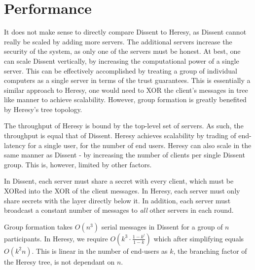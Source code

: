\section{Performance}

It does not make sense to directly compare Dissent to Heresy, as Dissent cannot really be scaled by adding more servers. The additional servers increase the security of the system, as only one of the servers must be honest. At best, one can scale Dissent vertically, by increasing the computational power of a single server. This can be effectively accomplished by treating a group of individual computers as a single server in terms of the trust guarantees. This is essentially a similar approach to Heresy, one would need to XOR the client's messages in tree like manner to achieve scalability. However, group formation is greatly benefited  by Heresy's tree topology.

The throughput of Heresy is bound by the top-level set of servers. As such,
the throughput is equal that of Dissent. Heresy achieves scalability by trading of end-latency for a single user, for the number of end users. Heresy can also scale in the same manner as Dissent - by increasing the number of clients per single Dissent group. This is, however, limited by other factors.

In Dissent, each server must share a secret with every client, which must be XORed into the XOR of the client messages. In Heresy, each server must only share secrets with the layer directly below it. In addition, each server must broadcast a constant number of messages to \emph{all} other servers in each round. 
 
Group formation takes $O(n^3)$ serial messages in Dissent for a group of $n$ participants. In Heresy, we require $O(k^3 \cdot \frac{1-k^l}{1-k})$ which after simplifying equals $O(k^2n)$. This is linear in the number of end-users as $k$, the branching factor of the Heresy tree, is not dependant on $n$.
